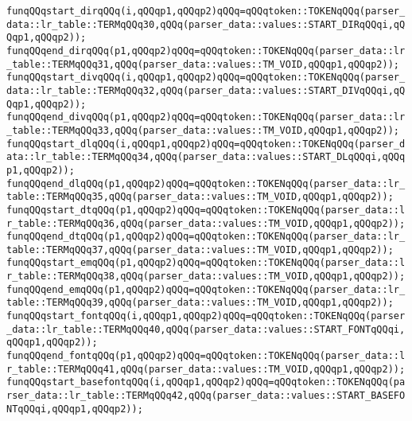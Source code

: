 \verb|funqQQqstart_dirqQQq(i,qQQqp1,qQQqp2)qQQq=qQQqtoken::TOKENqQQq(parser_data::lr_table::TERMqQQq30,qQQq(parser_data::values::START_DIRqQQqi,qQQqp1,qQQqp2));|\newline
\verb|funqQQqend_dirqQQq(p1,qQQqp2)qQQq=qQQqtoken::TOKENqQQq(parser_data::lr_table::TERMqQQq31,qQQq(parser_data::values::TM_VOID,qQQqp1,qQQqp2));|\newline
\verb|funqQQqstart_divqQQq(i,qQQqp1,qQQqp2)qQQq=qQQqtoken::TOKENqQQq(parser_data::lr_table::TERMqQQq32,qQQq(parser_data::values::START_DIVqQQqi,qQQqp1,qQQqp2));|\newline
\verb|funqQQqend_divqQQq(p1,qQQqp2)qQQq=qQQqtoken::TOKENqQQq(parser_data::lr_table::TERMqQQq33,qQQq(parser_data::values::TM_VOID,qQQqp1,qQQqp2));|\newline
\verb|funqQQqstart_dlqQQq(i,qQQqp1,qQQqp2)qQQq=qQQqtoken::TOKENqQQq(parser_data::lr_table::TERMqQQq34,qQQq(parser_data::values::START_DLqQQqi,qQQqp1,qQQqp2));|\newline
\verb|funqQQqend_dlqQQq(p1,qQQqp2)qQQq=qQQqtoken::TOKENqQQq(parser_data::lr_table::TERMqQQq35,qQQq(parser_data::values::TM_VOID,qQQqp1,qQQqp2));|\newline
\verb|funqQQqstart_dtqQQq(p1,qQQqp2)qQQq=qQQqtoken::TOKENqQQq(parser_data::lr_table::TERMqQQq36,qQQq(parser_data::values::TM_VOID,qQQqp1,qQQqp2));|\newline
\verb|funqQQqend_dtqQQq(p1,qQQqp2)qQQq=qQQqtoken::TOKENqQQq(parser_data::lr_table::TERMqQQq37,qQQq(parser_data::values::TM_VOID,qQQqp1,qQQqp2));|\newline
\verb|funqQQqstart_emqQQq(p1,qQQqp2)qQQq=qQQqtoken::TOKENqQQq(parser_data::lr_table::TERMqQQq38,qQQq(parser_data::values::TM_VOID,qQQqp1,qQQqp2));|\newline
\verb|funqQQqend_emqQQq(p1,qQQqp2)qQQq=qQQqtoken::TOKENqQQq(parser_data::lr_table::TERMqQQq39,qQQq(parser_data::values::TM_VOID,qQQqp1,qQQqp2));|\newline
\verb|funqQQqstart_fontqQQq(i,qQQqp1,qQQqp2)qQQq=qQQqtoken::TOKENqQQq(parser_data::lr_table::TERMqQQq40,qQQq(parser_data::values::START_FONTqQQqi,qQQqp1,qQQqp2));|\newline
\verb|funqQQqend_fontqQQq(p1,qQQqp2)qQQq=qQQqtoken::TOKENqQQq(parser_data::lr_table::TERMqQQq41,qQQq(parser_data::values::TM_VOID,qQQqp1,qQQqp2));|\newline
\verb|funqQQqstart_basefontqQQq(i,qQQqp1,qQQqp2)qQQq=qQQqtoken::TOKENqQQq(parser_data::lr_table::TERMqQQq42,qQQq(parser_data::values::START_BASEFONTqQQqi,qQQqp1,qQQqp2));|\newline
